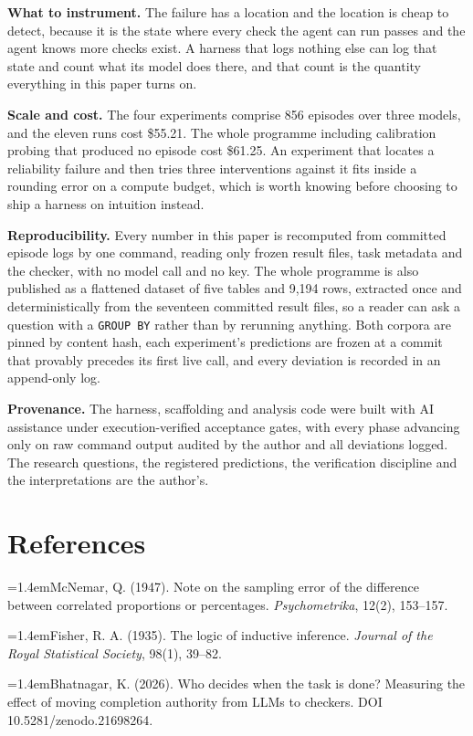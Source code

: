 \documentclass[11pt]{article}
\begin{document}
\textbf{What to instrument.} The failure has a location and the location is cheap to detect, because it is the state where every check the agent can run passes and the agent knows more checks exist. A harness that logs nothing else can log that state and count what its model does there, and that count is the quantity everything in this paper turns on.

\textbf{Scale and cost.} The four experiments comprise 856 episodes over three models, and the eleven runs cost \$55.21. The whole programme including calibration probing that produced no episode cost \$61.25. An experiment that locates a reliability failure and then tries three interventions against it fits inside a rounding error on a compute budget, which is worth knowing before choosing to ship a harness on intuition instead.

\textbf{Reproducibility.} Every number in this paper is recomputed from committed episode logs by one command, reading only frozen result files, task metadata and the checker, with no model call and no key. The whole programme is also published as a flattened dataset of five tables and 9,194 rows, extracted once and deterministically from the seventeen committed result files, so a reader can ask a question with a \texttt{GROUP BY} rather than by rerunning anything. Both corpora are pinned by content hash, each experiment's predictions are frozen at a commit that provably precedes its first live call, and every deviation is recorded in an append-only log.

\textbf{Provenance.} The harness, scaffolding and analysis code were built with AI assistance under execution-verified acceptance gates, with every phase advancing only on raw command output audited by the author and all deviations logged. The research questions, the registered predictions, the verification discipline and the interpretations are the author's.

\section{References}

\hangindent=1.4em\noindent McNemar, Q. (1947). Note on the sampling error of the difference between correlated proportions or percentages. \emph{Psychometrika}, 12(2), 153--157.

\hangindent=1.4em\noindent Fisher, R. A. (1935). The logic of inductive inference. \emph{Journal of the Royal Statistical Society}, 98(1), 39--82.

\hangindent=1.4em\noindent Bhatnagar, K. (2026). Who decides when the task is done? Measuring the effect of moving completion authority from LLMs to checkers. DOI 10.5281/zenodo.21698264.
\end{document}
